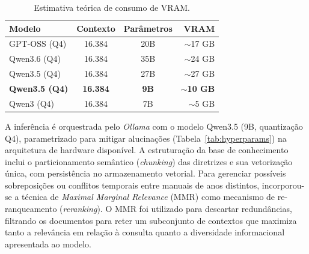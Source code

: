 \documentclass[12pt]{article}
\begin{document}
\begin{table}[H]
  \centering
  \caption{Estimativa teórica de consumo de VRAM.}
  \label{tab:latency_compatibility}
  \small
  \begin{tabular}{l c c r}
    \toprule
    \textbf{Modelo}       & \textbf{Contexto} & \textbf{Parâmetros} & \textbf{VRAM}        \\
    \midrule
    GPT-OSS (Q4)          & 16.384            & 20B                 & $\sim$17 GB          \\
    Qwen3.6 (Q4)          & 16.384            & 35B                 & $\sim$24 GB          \\
    Qwen3.5 (Q4)          & 16.384            & 27B                 & $\sim$27 GB          \\
    \textbf{Qwen3.5 (Q4)} & \textbf{16.384}   & \textbf{9B}         & \textbf{$\sim$10 GB} \\
    Qwen3 (Q4)            & 16.384            & 7B                  & $\sim$5 GB           \\
    \bottomrule
  \end{tabular}
\end{table}

A inferência é orquestrada pelo \textit{Ollama} com o modelo Qwen3.5 (9B, quantização Q4), parametrizado para mitigar alucinações (Tabela~\ref{tab:hyperparams}) na arquitetura de hardware disponível.
A estruturação da base de conhecimento inclui o particionamento semântico (\textit{chunking}) das diretrizes e sua vetorização única, com persistência no armazenamento vetorial.
Para gerenciar possíveis sobreposições ou conflitos temporais entre manuais de anos distintos, incorporou-se a técnica de \textit{Maximal Marginal Relevance} (MMR) como mecanismo de re-ranqueamento (\textit{reranking}).
O MMR foi utilizado para descartar redundâncias, filtrando os documentos para reter um subconjunto de contextos que maximiza tanto a relevância em relação à consulta quanto a diversidade informacional apresentada ao modelo.
\end{document}
